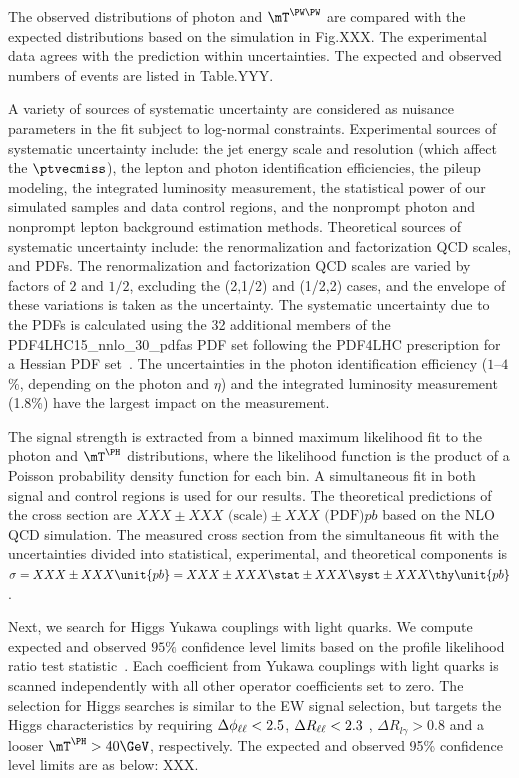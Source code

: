 The observed distributions of photon \pt and $\mTWW$ are compared with the expected distributions based on the \MGvATNLO simulation in Fig.XXX. The experimental data agrees with the prediction within uncertainties. The expected and observed numbers of events are listed in Table.YYY.

A variety of sources of systematic uncertainty are considered as nuisance parameters in the fit subject to log-normal constraints. Experimental sources of systematic uncertainty include: the jet energy scale and resolution (which affect the $\ptvecmiss$), the lepton and photon identification efficiencies, the pileup modeling, the integrated luminosity measurement, the statistical power of our simulated samples and data control regions, and the nonprompt photon and nonprompt lepton background estimation methods. Theoretical sources of systematic uncertainty include: the renormalization and factorization QCD scales, and PDFs. The renormalization and factorization QCD scales are varied by factors of $2$ and $1/2$, excluding the (2,1/2) and (1/2,2) cases, and the envelope of these variations is taken as the uncertainty. The systematic uncertainty due to the PDFs is calculated using the 32 additional members of the PDF4LHC15\_nnlo\_30\_pdfas PDF set following the PDF4LHC prescription for a Hessian PDF set~\cite{Butterworth_2016,Harland_Lang_2015,Ball_2015,PhysRevD.93.033006}. The uncertainties in the photon identification efficiency ($1$--$4$\%, depending on the photon \pt and $\eta$) and the integrated luminosity measurement (1.8\%) have the largest impact on the measurement.

The signal strength is extracted from a binned maximum likelihood fit to the photon \pt and $\mTH$ distributions, where the likelihood function is the product of a Poisson probability density function for each bin. A simultaneous fit in both signal and control regions is used for our results. The theoretical predictions of the cross section are $XXX \pm XXX \text{ (scale)} \pm XXX \text{ (PDF)} \unit{pb}$ based on the NLO QCD \MGvATNLO simulation. The measured cross section from the simultaneous fit with the uncertainties divided into statistical, experimental, and theoretical components is $\sigma = XXX \pm XXX \unit{pb} =XXX \pm XXX \stat \pm XXX \syst \pm XXX \thy \unit{pb}$. 

Next, we search for Higgs Yukawa couplings with light quarks. We compute expected and observed $95\%$ confidence level limits based on the profile likelihood ratio test statistic~\cite{CMS-NOTE-2011-005}. Each coefficient from  Yukawa couplings with light quarks is scanned independently with all other operator coefficients set to zero. The selection for Higgs searches is similar to the EW signal selection, but targets the Higgs characteristics by requiring $\Delta\phi_{\ell\ell}<2.5$, $\Delta R_{\ell\ell}<2.3$ , $\Delta R_{l\gamma} >0.8$ and a looser $\mTH > 40\GeV$, respectively. The expected and observed 95\% confidence level limits are as below: XXX.

